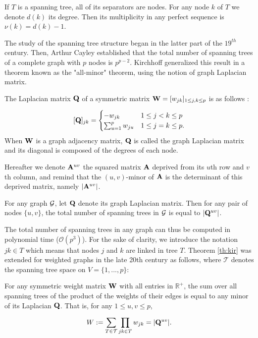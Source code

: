 \begin{prop}
If $T$ is a spanning tree, all of its separators are nodes. For any node $k$ of $T$ we denote $d(k)$ its degree. Then its multiplicity in any perfect sequence is $\nu(k) = d(k)-1$.
\end{prop}
 
 
 The study of the spanning tree structure began in the latter part of the $19^{th}$ century. Then, Arthur Cayley established that the total number of spanning trees of a complete graph with $p$ nodes is $p^{p-2}$. Kirchhoff generalized this result in a theorem known as the "all-minor" theorem, using the notion of graph Laplacian matrix.
  \begin{definition}
 \label{laplacian}
 The Laplacian matrix ${\bf Q}$ of a symmetric matrix ${\bf W}=[w_{jk} ]_{1\leq j,k\leq p}$ is as follows :

\[
 [{\bf Q}]_{jk}  =\begin{cases}
    -w_{jk}  & 1\leq j<k \leq p\\
    \sum_{u=1}^p w_{ju} & 1\leq j=k \leq p.
    \end{cases}
\]
When ${\bf W}$ is a graph adjacency matrix, ${\bf Q}$ is called the graph Laplacian matrix and its diagonal is composed of the degrees of each node.
 \end{definition}
 
 Hereafter we denote ${\bf A}^{uv}$ the squared matrix ${\bf A}$ deprived from its $u$th row and $v$th column, and remind that the $(u, v)$-minor of ${\bf A}$ is the determinant of this deprived matrix, namely $|{\bf A}^{uv}|$.
 
 \begin{theorem}\label{th:kir}
 For any graph $\mathcal{G}$, let  ${\bf Q}$ denote its graph Laplacian matrix. Then for any  pair of nodes $\{u,v\}$, the total number of spanning trees in $\mathcal{G}$ is equal to  $|{\bf Q}^{uv}|$.
\end{theorem}  

 
The total number of spanning trees in any graph can thus be computed in polynomial time ($\mathcal{O}(p^3)$). For the sake of clarity, we introduce the notation $jk\in T$ which means that nodes $j$ and $k$ are linked in tree $T$. Theorem \ref{th:kir} was extended for weighted graphs in the late 20th century as follows, where $\mathcal{T}$ denotes the spanning tree space on $V=\{1,...,p\}$:

\begin{theorem} \label{thmm:MTT}
    For any symmetric weight matrix ${\bf W}$ with all entries in $\mathds{R}^+$, the sum over all spanning trees of the product of the weights of their edges is equal to any minor of its Laplacian ${\bf Q}$. That is, for any $1 \leq u, v \leq p$,
 
   \[
    W := \sum_{T\in\mathcal{T}} \prod_{jk\in T} w_{jk} = |{\bf Q}^{uv}|.
    \]
   
\end{theorem}    

